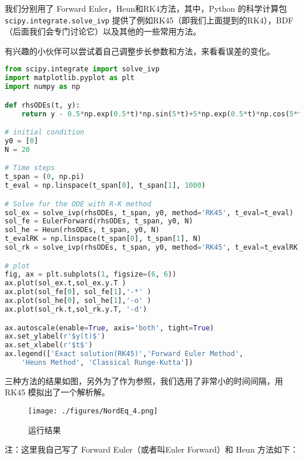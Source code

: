 我们分别用了 Forward Euler，Heun和RK4方法，其中，Python 的科学计算包 \verb|scipy.integrate.solve_ivp| 提供了例如RK45（即我们上面提到的RK4），BDF（后面我们会专门讨论它）以及其他的一些常用方法。

有兴趣的小伙伴可以尝试着自己调整步长参数和方法，来看看误差的变化。
\begin{lstlisting}[language=python]
from scipy.integrate import solve_ivp
import matplotlib.pyplot as plt
import numpy as np

def rhsODEs(t, y):
    return y - 0.5*np.exp(0.5*t)*np.sin(5*t)+5*np.exp(0.5*t)*np.cos(5*t)

# initial condition
y0 = [0]
N = 20

# Time steps
t_span = (0, np.pi)
t_eval = np.linspace(t_span[0], t_span[1], 1000)

# Solve for the ODE with R-K method
sol_ex = solve_ivp(rhsODEs, t_span, y0, method='RK45', t_eval=t_eval)
sol_fe = EulerForward(rhsODEs, t_span, y0, N)
sol_he = Heun(rhsODEs, t_span, y0, N)
t_evalRK = np.linspace(t_span[0], t_span[1], N)
sol_rk = solve_ivp(rhsODEs, t_span, y0, method='RK45', t_eval=t_evalRK)

# plot
fig, ax = plt.subplots(1, figsize=(6, 6))
ax.plot(sol_ex.t,sol_ex.y.T )
ax.plot(sol_fe[0], sol_fe[1],'-*' )
ax.plot(sol_he[0], sol_he[1],'-o' )
ax.plot(sol_rk.t,sol_rk.y.T, '-d')

ax.autoscale(enable=True, axis='both', tight=True)
ax.set_ylabel(r'$y(t)$')
ax.set_xlabel(r'$t$')
ax.legend(['Exact solution(RK45)','Forward Euler Method',
    'Heuns Method', 'Classical Runge-Kutta'])
\end{lstlisting}

三种方法的结果如图，另外为了作为参照，我们选用了非常小的时间间隔，用 RK45 模拟出了一个解析解。

\begin{figure}[ht]
\centering
\texttt{[image: ./figures/NordEq\_4.png]}
\caption{运行结果} \label{NordEq_fig4}
\end{figure}

注：这里我自己写了 Forward Euler（或者叫Euler Forward）和 Heun 方法如下：

